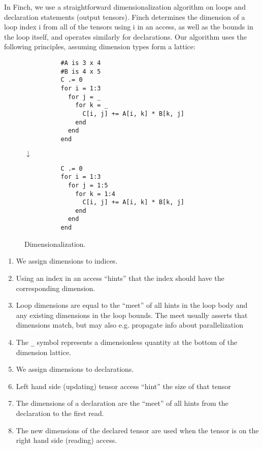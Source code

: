     In Finch, we use a straightforward dimensionalization algorithm on loops and declaration statements (output tensors).
    Finch determines the dimension of a loop index i from all of the tensors using i in an access, as well as the bounds in the loop itself, and operates similarly for declarations.
    Our algorithm uses the following principles, assuming dimension types form a lattice:
    \begin{wrapfigure}{r}{0.25\textwidth}
        \begin{verbatim}
          #A is 3 x 4
          #B is 4 x 5
          C .= 0
          for i = 1:3
            for j = _
              for k = _
                C[i, j] += A[i, k] * B[k, j]
              end
            end
          end
        \end{verbatim}
        $\downarrow$
        \begin{verbatim}
          C .= 0
          for i = 1:3
            for j = 1:5
              for k = 1:4
                C[i, j] += A[i, k] * B[k, j]
              end
            end
          end
        \end{verbatim}
        \caption{Dimensionalization.}\label{fig:dimensionalization}
        \vspace{-12pt}
    \end{wrapfigure}
    \begin{enumerate}
        \item We assign dimensions to indices.
        \item Using an index in an access “hints” that the index should have the corresponding dimension.
        \item Loop dimensions are equal to the “meet” of all hints in the loop body
        and any existing dimensions in the loop bounds. The meet usually asserts
        that dimensions match, but may also e.g. propagate info about parallelization
        \item The \texttt{_} symbol represents a dimensionless quantity at the bottom of the dimension lattice.
        \item We assign dimensions to declarations.
        \item Left hand side (updating) tensor access “hint” the size of that tensor
        \item The dimensions of a declaration are the “meet” of all hints from
        the declaration to the first read.
        \item The new dimensions of the declared tensor are used when the tensor is on the right hand side (reading)
        access.
    \end{enumerate}

